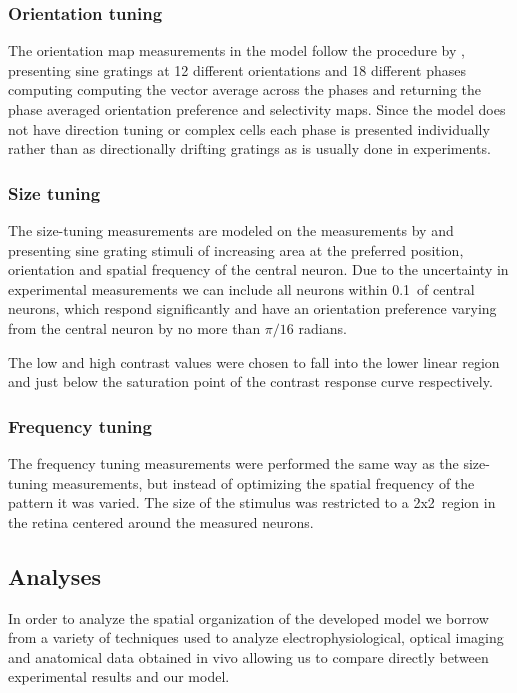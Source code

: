 \subsubsection*{Orientation tuning} \label{ORMeasurement}

The orientation map measurements in the model follow the procedure by
\cite{Blasdel1992}, presenting sine gratings at 12 different
orientations and 18 different phases computing computing the vector
average across the phases and returning the phase averaged orientation
preference and selectivity maps. Since the model does not have
direction tuning or complex cells each phase is presented individually
rather than as directionally drifting gratings as is usually done in
experiments.

\subsubsection*{Size tuning}

The size-tuning measurements are modeled on the measurements by
\cite{Sceniak1999} and \cite{Sceniak2001} presenting sine grating
stimuli of increasing area at the preferred position, orientation and
spatial frequency of the central neuron. Due to the uncertainty in
experimental measurements we can include all neurons within
0.1\degree\ of central neurons, which respond significantly and have
an orientation preference varying from the central neuron by no more
than $\pi/16$ radians.

The low and high contrast values were chosen to fall into the lower
linear region and just below the saturation point of the contrast
response curve respectively.

\subsubsection*{Frequency tuning}

The frequency tuning measurements were performed the same way as the
size-tuning measurements, but instead of optimizing the spatial
frequency of the pattern it was varied. The size of the stimulus was
restricted to a 2x2\degree\ region in the retina centered around the
measured neurons.

\subsection{Analyses}

In order to analyze the spatial organization of the developed model we
borrow from a variety of techniques used to analyze
electrophysiological, optical imaging and anatomical data obtained in
vivo allowing us to compare directly between experimental results and
our model.

